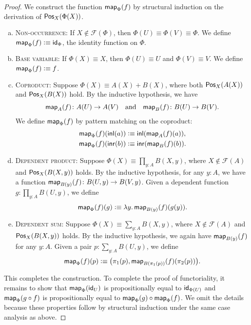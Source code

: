\begin{proof}
    We construct the function $\mathsf{map}_\Phi(f)$ by structural induction on the derivation of $\mathsf{Pos}_X(\Phi(X))$.

    \begin{enumerate}[a),font=\upshape]
        \item \textsc{Non-occurrence:} If $X \notin \mathcal F(\Phi)$, then $\Phi(U) \equiv \Phi(V) \equiv \Phi$. We define $\mathsf{map}_\Phi(f)\mathrel{\vcentcolon}\equiv\mathsf{id}_\Phi$, the identity function on $\Phi$.
        
        \item \textsc{Base variable:} If $\Phi(X) \equiv X$, then $\Phi(U) \equiv U$ and $\Phi(V) \equiv V$. We define $\mathsf{map}_\Phi(f) \mathrel{\vcentcolon}\equiv f$.

        \item \textsc{Coproduct:} Suppose $\Phi(X) \equiv A(X) + B(X)$, where both $\mathsf{Pos}_X(A(X))$ and $\mathsf{Pos}_X(B(X))$ hold. By the inductive hypothesis, we have 
        \[
            \fun{map}_A(f)\colon A(U)\to A(V)
            \quad\text{and}\quad
            \fun{map}_B(f)\colon B(U)\to B(V).
        \]
        We define $\mathsf{map}_\Phi(f)$ by pattern matching on the coproduct:
        \begin{align*}
            \mathsf{map}_\Phi(f)(\mathsf{inl}(a)) &\mathrel{\vcentcolon}\equiv \mathsf{inl}(\mathsf{map}_A(f)(a)),\\
            \mathsf{map}_\Phi(f)(\mathsf{inr}(b)) &\mathrel{\vcentcolon}\equiv \mathsf{inr}(\mathsf{map}_B(f)(b)).
        \end{align*}
        
        \item \textsc{Dependent product:} Suppose $\Phi(X) \equiv \prod_{y\colon A} B(X,y)$, where $X \notin \mathcal F(A)$ and $\mathsf{Pos}_X(B(X,y))$ holds. By the inductive hypothesis, for any $y\colon A$, we have a function $\fun{map}_{B(y)}(f)\colon B(U,y)\to B(V,y)$. Given a dependent function $g\colon \prod_{y\colon A} B(U,y)$, we define
        \[
            \mathsf{map}_\Phi(f)(g)\mathrel{\vcentcolon}\equiv
                \lambda y.\,\mathsf{map}_{B(y)}(f)(g(y)).
        \]
        
        \item \textsc{Dependent sum:} Suppose $\Phi(X) \equiv \sum_{y\colon A} B(X,y)$, where $X \notin \mathcal F(A)$ and $\mathsf{Pos}_X(B(X,y))$ holds. By the inductive hypothesis, we again have $\mathsf{map}_{B(y)}(f)$ for any $y\colon A$. Given a pair $p\colon \sum_{y\colon A} B(U,y)$, we define
        \[
            \mathsf{map}_\Phi(f)(p)\mathrel{\vcentcolon}\equiv
                \bigl(
                    \pi_1(p),
                    \mathsf{map}_{B(\pi_1(p))}(f)(\pi_2(p))
                \bigr).
        \]
    \end{enumerate}
    This completes the construction. To complete the proof of functoriality, it remains to show that $\mathsf{map}_\Phi(\mathsf{id}_U)$ is propositionally equal to $\mathsf{id}_{\Phi(U)}$ and $\mathsf{map}_\Phi(g \circ f)$ is propositionally equal to $\mathsf{map}_\Phi(g) \circ \mathsf{map}_\Phi(f)$. We omit the details because these properties follow by structural induction under the same case analysis as above.
\end{proof}

